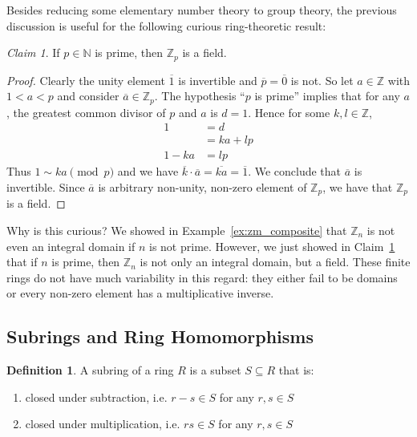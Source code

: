 \documentclass[12pt,letterpaper,DIV=11,final]{scrartcl}
\theoremstyle{plain}
\theoremstyle{definition}
\newtheorem{definition}{Definition}[section]
\theoremstyle{remark}
\newtheorem{claim}{Claim}
\begin{document}
Besides reducing some elementary number theory to group theory, the previous discussion is useful for the following curious ring-theoretic result:

\begin{claim}\label{claim:zn_field}
  If $p \in \mathbb{N}$ is prime, then $\mathbb{Z}_p$ is a field.

  \begin{proof}
    Clearly the unity element $\overline{1}$ is invertible and $\overline{p} = \overline{0}$ is not.
    So let $a \in \mathbb{Z}$ with $1 < a < p$ and consider $\overline{a} \in \mathbb{Z}_p$.
    The hypothesis \enquote{$p$ is prime} implies that for any $a$, the greatest common divisor of $p$ and $a$ is $d = 1$.
    Hence for some $k, l \in \mathbb{Z}$,
    \begin{align*}
      1      &= d \\
             &= ka + lp \\
      1 - ka &= lp
    \end{align*}
    Thus $1 \sim ka \pmod{p}$ and we have $\overline{k} \cdot \overline{a} = \overline{ka} = \overline{1}$.
    We conclude that $\overline{a}$ is invertible.
    Since $\overline{a}$ is arbitrary non-unity, non-zero element of $\mathbb{Z}_p$, we have that $\mathbb{Z}_p$ is a field.
  \end{proof}
\end{claim}

Why is this curious?
We showed in Example~\ref{ex:zm_composite} that $\mathbb{Z}_n$ is not even an integral domain if $n$ is not prime.
However, we just showed in Claim~\ref{claim:zn_field} that if $n$ is prime, then $\mathbb{Z}_n$ is not only an integral domain, but a field.
These finite rings do not have much variability in this regard: they either fail to be domains or every non-zero element has a multiplicative inverse.

\subsection{Subrings and Ring Homomorphisms}
\begin{definition}\label{def:subring}
  A subring of a ring $R$ is a subset $S \subseteq R$ that is:
  \begin{enumerate}
    \item closed under subtraction, i.e. $r - s \in S$ for any $r, s \in S$
    \item closed under multiplication, i.e. $rs \in S$ for any $r, s \in S$
  \end{enumerate}
\end{definition}
\end{document}
